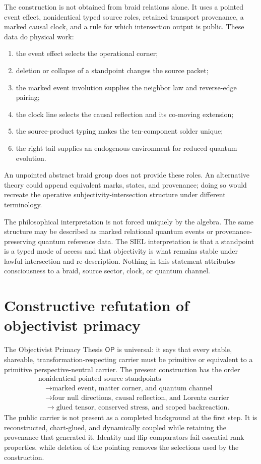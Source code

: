 \documentclass[11pt]{article}
\theoremstyle{definition}
\theoremstyle{remark}
\newcommand{\OPT}{\mathsf{OP}}
\begin{document}
The construction is not obtained from braid relations alone. It uses a pointed event effect, nonidentical typed source roles, retained transport provenance, a marked causal clock, and a rule for which intersection output is public. These data do physical work:
\begin{enumerate}
\item the event effect selects the operational corner;
\item deletion or collapse of a standpoint changes the source packet;
\item the marked event involution supplies the neighbor law and reverse-edge pairing;
\item the clock line selects the causal reflection and its co-moving extension;
\item the source-product typing makes the ten-component solder unique;
\item the right tail supplies an endogenous environment for reduced quantum evolution.
\end{enumerate}
An unpointed abstract braid group does not provide these roles. An alternative theory could append equivalent marks, states, and provenance; doing so would recreate the operative subjectivity-intersection structure under different terminology.

The philosophical interpretation is not forced uniquely by the algebra. The same structure may be described as marked relational quantum events or provenance-preserving quantum reference data. The SIEL interpretation is that a standpoint is a typed mode of access and that objectivity is what remains stable under lawful intersection and re-description. Nothing in this statement attributes consciousness to a braid, source sector, clock, or quantum channel.

\section{Constructive refutation of objectivist primacy}

The Objectivist Primacy Thesis $\OPT$ is universal: it says that every stable, shareable, transformation-respecting carrier must be primitive or equivalent to a primitive perspective-neutral carrier. The present construction has the order
\begin{equation}
 \begin{aligned}
 &\text{nonidentical pointed source standpoints}\\
 &\quad\longrightarrow\text{marked event, matter corner, and quantum channel}\\
 &\quad\longrightarrow\text{four null directions, causal reflection, and Lorentz carrier}\\
 &\quad\longrightarrow\text{glued tensor, conserved stress, and scoped backreaction}.
 \end{aligned}
\end{equation}
The public carrier is not present as a completed background at the first step. It is reconstructed, chart-glued, and dynamically coupled while retaining the provenance that generated it. Identity and flip comparators fail essential rank properties, while deletion of the pointing removes the selections used by the construction.
\end{document}
